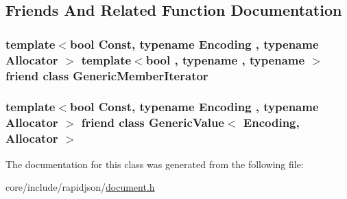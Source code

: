 \subsection{Friends And Related Function Documentation}
\subsubsection[{\texorpdfstring{Generic\+Member\+Iterator}{GenericMemberIterator}}]{\setlength{\rightskip}{0pt plus 5cm}template$<$bool Const, typename Encoding , typename Allocator $>$ template$<$bool , typename , typename $>$ friend class {\bf Generic\+Member\+Iterator}\hspace{0.3cm}{\ttfamily [friend]}}\hypertarget{classGenericMemberIterator_aa375aeb1ffac85cddc3a72a6c24ec6e1}{}\label{classGenericMemberIterator_aa375aeb1ffac85cddc3a72a6c24ec6e1}
\subsubsection[{\texorpdfstring{Generic\+Value$<$ Encoding, Allocator $>$}{GenericValue< Encoding, Allocator >}}]{\setlength{\rightskip}{0pt plus 5cm}template$<$bool Const, typename Encoding , typename Allocator $>$ friend class {\bf Generic\+Value}$<$ Encoding, Allocator $>$\hspace{0.3cm}{\ttfamily [friend]}}\hypertarget{classGenericMemberIterator_a82bdd5798f1a5ac0e3e7ba4bd6938cfc}{}\label{classGenericMemberIterator_a82bdd5798f1a5ac0e3e7ba4bd6938cfc}


The documentation for this class was generated from the following file\+:\begin{DoxyCompactItemize}
\item 
core/include/rapidjson/\hyperlink{document_8h}{document.\+h}\end{DoxyCompactItemize}

